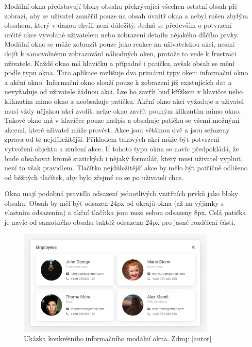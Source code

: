 			Modální okna představují bloky obsahu překrývající všechen ostatní obsah při zobrazí, aby se uživatel zaměřil
			pouze na obsah uvnitř okna a nebyl rušen zbylým obsahem, který v danou chvíli není důležitý.
			Jedná se především o potvrzení určité akce vyvolané uživatelem nebo zobrazení detailu nějakého dílčího prvky.
			Modální okno se může zobrazit pouze jako reakce na uživatelskou akci, nesmí dojít k samovolnému zobrazování
			náhodných oken, protože to vede k frustraci uživatele.
			Každé okno má hlavičku a případně i patičku, avšak obsah se mění podle typu okna.
			Tato aplikace rozlišuje dva primární typy oken: informační okno a akční okno.
			Informační okno slouží pouze k zobrazení již existujících dat a nevyžaduje od uživatele žádnou akci.
			Lze ho zavřít buď křížkem v hlavičce nebo kliknutím mimo okno a neobsahuje patičku.
			Akční okno akci vyžaduje a uživatel musí vždy nějakou akci zvolit, nelze okno zavřít pouhým kliknutím mimo okno.
			Takové okno má v hlavičce pouze nadpis a obsahuje patičku se všemi možnými akcemi, které uživatel může provést.
			Akce jsou většinou dvě a jsou seřazeny zprava od té nejdůležitější.
			Příkladem takových akcí může být potvrzení vytvoření objektu a zrušení akce.
			U tohoto typu okna se navíc předpokládá, že bude obsahovat kromě statických i nějaký formulář, který musí
			uživatel vyplnit, není to však pravidlem.
			Tlačítko nejdůležitější akce by mělo být patřičně odlišeno od běžných tlačítek, aby bylo zřejmé co se po
			uživateli chce.

			Okna mají podobná pravidla odsazení jednotlivých vnitřních prvků jako bloky obsahu.
			Obsah by měl být odsazen 24px od okrajů okna (až na výjimky s vlastním odsazením) a akční tlačítka jsou
			mezi sebou odsazeny 8px.
			Celá patička je navíc od samotného obsahu taktéž odsazena 24px pro jasné rozdělení částí.

			\begin{figure}[H]
				\centering
				\includegraphics[width=10cm]{obrazky/modalni_okno_informacni_ukazka}\hfill
				\caption{Ukázka konkrétního informačního modální okna. Zdroj: [autor]}
			\end{figure}

